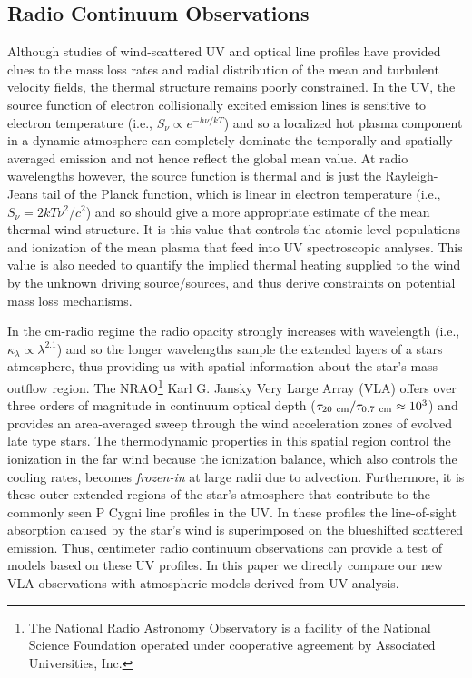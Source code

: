 \documentclass[iop]{emulateapj}
\begin{document}
\subsection{Radio Continuum Observations} \label{intro1} 

Although studies of wind-scattered UV and optical line profiles have provided clues to the mass loss rates and radial distribution of the mean and turbulent velocity fields, the thermal structure remains poorly constrained. In the UV, the source function of electron collisionally excited emission lines is sensitive to electron temperature (i.e., $S_{\nu} \propto e^{-h\nu /kT}$) and so a localized hot plasma component in a dynamic atmosphere can completely dominate the temporally and spatially averaged emission and not hence reflect the global mean value. At radio wavelengths however, the source function is thermal and is just the Rayleigh-Jeans tail of the Planck function, which is linear in electron temperature (i.e., $S_{\nu} = {2kT\nu ^2 /c^2}$) and so should give a more appropriate estimate of the mean thermal wind structure. It is this value that controls the atomic level populations and ionization of the mean plasma that feed into UV spectroscopic analyses. This value is also needed to quantify the implied thermal heating supplied to the  wind by the unknown driving source/sources, and thus derive constraints on potential mass loss mechanisms.

In the cm-radio regime the radio opacity strongly increases with wavelength (i.e., $ \kappa _{\lambda} \propto \lambda ^{2.1}$) and so the longer wavelengths sample the extended layers of a stars atmosphere, thus	 providing us with spatial information about the star's mass outflow region. The NRAO\footnote{The National Radio Astronomy Observatory is a facility of the National Science Foundation operated under cooperative agreement by Associated Universities, Inc.} Karl G. Jansky Very Large Array (VLA) offers over three orders of magnitude in continuum optical depth ($\tau _{20 \ \rm{cm}}/\tau _{0.7 \ \rm{cm}} \approx 10^3$) and provides an area-averaged sweep through the wind acceleration zones of evolved late type stars. The thermodynamic properties in this spatial region control the ionization in the far wind because the ionization balance, which also controls the cooling rates, becomes \textit{frozen-in} at large radii due to advection. Furthermore, it is these outer extended regions of the star's atmosphere that contribute to the commonly seen P Cygni line profiles in the UV. In these profiles the line-of-sight absorption caused by the star's wind is superimposed on the blueshifted scattered emission. Thus, centimeter radio continuum observations can provide a test of models based on these UV profiles. In this paper we directly compare our new VLA observations with atmospheric models derived from UV analysis.
\end{document}
